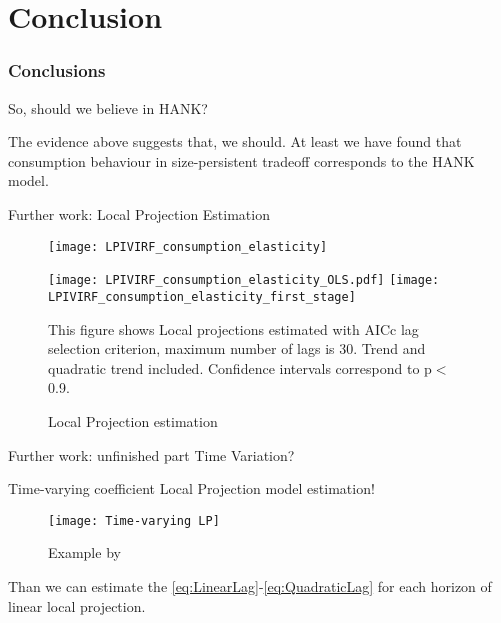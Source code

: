 \documentclass[11pt,pdf,aspectratio=129]{beamer}
\begin{document}
\section{Conclusion}
\begin{frame}\frametitle{Conclusions}
    \begin{block}{So, should we believe in HANK?}

        The evidence above suggests that, we should. 
        At least we have found that consumption behaviour in size-persistent tradeoff corresponds to the HANK model.


    \end{block}
\end{frame}




\begin{frame}{Further work: Local Projection Estimation}
\begin{figure}[!htbp]
    \begin{minipage}{0.9\textwidth}
        \caption{Local Projection estimation}
        \begin{minipage}{0.6\textwidth}
            \texttt{[image: LPIVIRF\_consumption\_elasticity]}
        \end{minipage}\begin{minipage}{0.39\textwidth}
    \texttt{[image: LPIVIRF\_consumption\_elasticity\_OLS.pdf]}
    \texttt{[image: LPIVIRF\_consumption\_elasticity\_first\_stage]}
\end{minipage}
\begin{flushleft}\tiny
    This figure shows Local projections estimated with  AICc lag selection criterion,  maximum number of lags is 30.  Trend and quadratic trend included.
    Confidence intervals correspond to p$<$0.9.
\end{flushleft}
    \end{minipage}
\end{figure}
\end{frame}


\begin{frame}{Further work: unfinished part}
    Time Variation?


    Time-varying coefficient Local Projection model estimation!
    \begin{figure}[!h]
        \caption{Example by }
        \texttt{[image: Time-varying LP]}
    \end{figure}
    Than we can estimate the \eqref{eq:LinearLag}-\eqref{eq:QuadraticLag} for each horizon of linear local projection.
\end{frame}
\end{document}
